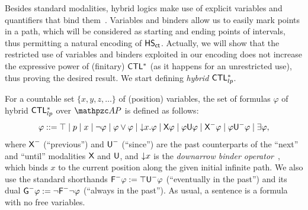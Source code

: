 Besides standard modalities, hybrid logics make use of explicit variables and quantifiers that bind them~\cite{BS98}.
Variables and binders allow us to easily mark points in a path, which will be considered as starting and ending points of intervals, thus permitting a natural encoding of $\text{\sffamily HS}_{\mathsf{ct}}$. Actually, we will show that the restricted use of variables and binders exploited in our encoding does not increase the expressive power of (finitary) $\text{\sffamily CTL$^{*}$}$ (as it happens for an unrestricted use), thus proving the desired result. We start defining \emph{hybrid} $\text{\sffamily CTL$^{*}_{lp}$}$.
%
%

For a countable set $\{x,y,z,\ldots\}$ of (position) variables, the set of  formulas $\varphi$ of
hybrid $\text{\sffamily CTL$^{*}_{lp}$}$  over $\Prop$ is defined as follows:
%
\[
\varphi ::= \top \mid p \mid x \mid \neg \varphi \mid \varphi \vee \varphi \mid \text{$\downarrow$$x$}.\varphi \mid \textsf{X} \varphi\mid \varphi \textsf{U} \varphi \mid \textsf{X}^{-} \varphi\mid \varphi \textsf{U}^{-} \varphi\mid \exists  \varphi,
\]
where $\textsf{X}^{-}$ (``previous'') and $\textsf{U}^{-}$ (``since'') are the  past counterparts of the ``next'' and ``until'' modalities $\textsf{X}$ and $\textsf{U}$, and $\text{$\downarrow$$x$}$ is the \emph{downarrow binder operator}~\cite{BS98}, which binds $x$ to the current position along the given initial infinite path. We also use the standard shorthands $\textsf{F}^{-}\varphi:= \top \textsf{U}^{-} \varphi$ (``eventually in the past'')  and its
dual  $\textsf{G}^{-} \varphi:=\neg \textsf{F}^{-}\neg\varphi$ (``always in the past''). As usual, a sentence is a formula with no free variables.

